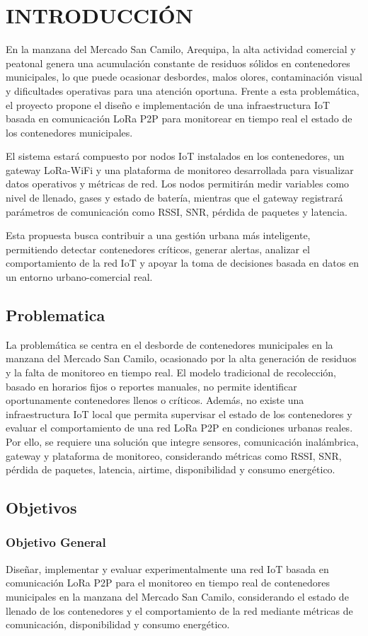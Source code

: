 \chapter{INTRODUCCIÓN}
En la manzana del Mercado San Camilo, Arequipa, la alta actividad comercial y peatonal genera una acumulación constante de residuos sólidos en contenedores municipales, lo que puede ocasionar desbordes, malos olores, contaminación visual y dificultades operativas para una atención oportuna. Frente a esta problemática, el proyecto propone el diseño e implementación de una infraestructura IoT basada en comunicación LoRa P2P para monitorear en tiempo real el estado de los contenedores municipales.

El sistema estará compuesto por nodos IoT instalados en los contenedores, un gateway LoRa-WiFi y una plataforma de monitoreo desarrollada para visualizar datos operativos y métricas de red. Los nodos permitirán medir variables como nivel de llenado, gases y estado de batería, mientras que el gateway registrará parámetros de comunicación como RSSI, SNR, pérdida de paquetes y latencia.

Esta propuesta busca contribuir a una gestión urbana más inteligente, permitiendo detectar contenedores críticos, generar alertas, analizar el comportamiento de la red IoT y apoyar la toma de decisiones basada en datos en un entorno urbano-comercial real.
\section{Problematica}
La problemática se centra en el desborde de contenedores municipales en la manzana del Mercado San Camilo, ocasionado por la alta generación de residuos y la falta de monitoreo en tiempo real. El modelo tradicional de recolección, basado en horarios fijos o reportes manuales, no permite identificar oportunamente contenedores llenos o críticos. Además, no existe una infraestructura IoT local que permita supervisar el estado de los contenedores y evaluar el comportamiento de una red LoRa P2P en condiciones urbanas reales. Por ello, se requiere una solución que integre sensores, comunicación inalámbrica, gateway y plataforma de monitoreo, considerando métricas como RSSI, SNR, pérdida de paquetes, latencia, airtime, disponibilidad y consumo energético.
\section{Objetivos}
\subsection{Objetivo General}
Diseñar, implementar y evaluar experimentalmente una red IoT basada en comunicación LoRa P2P para el monitoreo en tiempo real de contenedores municipales en la manzana del Mercado San Camilo, considerando el estado de llenado de los contenedores y el comportamiento de la red mediante métricas de comunicación, disponibilidad y consumo energético.
